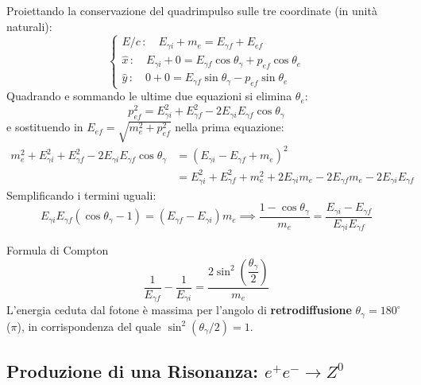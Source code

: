 Proiettando la conservazione del quadrimpulso sulle tre coordinate (in unità naturali):
\begin{equation}
    \begin{cases}
        E/c \, : \quad E_{\gamma i} + m_e = E_{\gamma f} + E_{ef} \\
        \hat{x} \, : \quad E_{\gamma i} + 0 = E_{\gamma f}\cos\theta_{\gamma} + p_{ef}\cos\theta_e \\
        \hat{y} \, : \quad 0 + 0 = E_{\gamma f}\sin\theta_{\gamma} - p_{ef}\sin\theta_e
    \end{cases}
\end{equation}
Quadrando e sommando le ultime due equazioni si elimina $\theta_e$:
\begin{equation*}
    p_{ef}^2 = E_{\gamma i}^2 + E_{\gamma f}^2 - 2E_{\gamma i}E_{\gamma f}\cos\theta_{\gamma}
\end{equation*}
e sostituendo in $E_{ef} = \sqrt{m_e^2 + p_{ef}^2}$ nella prima equazione:
\begin{align*}
    m_e^2 + E_{\gamma i}^2 + E_{\gamma f}^2 - 2E_{\gamma i}E_{\gamma f}\cos\theta_{\gamma}
    &= \left(E_{\gamma i} - E_{\gamma f} + m_e\right)^2 \\
    &= E_{\gamma i}^2 + E_{\gamma f}^2 + m_e^2 + 2E_{\gamma i}m_e - 2E_{\gamma f}m_e - 2E_{\gamma i}E_{\gamma f}
\end{align*}
Semplificando i termini uguali:
\begin{equation*}
    E_{\gamma i}E_{\gamma f}\left(\cos\theta_{\gamma} - 1\right) = \left(E_{\gamma f} - E_{\gamma i}\right)m_e
    \implies \frac{1 - \cos\theta_{\gamma}}{m_e} = \frac{E_{\gamma i} - E_{\gamma f}}{E_{\gamma i}E_{\gamma f}}
\end{equation*}

\begin{formulario}{Formula di Compton}
\begin{equation}
    \frac{1}{E_{\gamma f}} - \frac{1}{E_{\gamma i}} = \frac{2\sin^2\!\left(\dfrac{\theta_{\gamma}}{2}\right)}{m_e}
\end{equation}
L'energia ceduta dal fotone è massima per l'angolo di \textbf{retrodiffusione} $\theta_{\gamma} = 180^{\circ}$ ($\pi$), in corrispondenza del quale $\sin^2(\theta_\gamma/2) = 1$.
\end{formulario}

\subsection{Produzione di una Risonanza: $e^+ e^- \to Z^0$}

